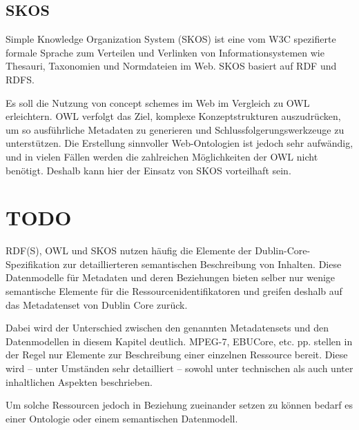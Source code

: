 	
	
	\subsection{SKOS}
	Simple Knowledge Organization System (SKOS) ist eine vom W3C spezifierte formale Sprache zum Verteilen und Verlinken von Informationsystemen wie Thesauri, Taxonomien und Normdateien im Web. SKOS basiert auf RDF und RDFS.
	
	Es soll die Nutzung von concept schemes im Web im Vergleich zu OWL erleichtern. OWL verfolgt das Ziel, komplexe Konzeptstrukturen auszudrücken, um so ausführliche Metadaten zu generieren und Schlussfolgerungswerkzeuge zu unterstützen. Die Erstellung sinnvoller Web-Ontologien ist jedoch sehr aufwändig, und in vielen Fällen werden die zahlreichen Möglichkeiten der OWL nicht benötigt. Deshalb kann hier der Einsatz von SKOS vorteilhaft sein.
	
	
	\section{TODO}
	RDF(S), OWL und SKOS nutzen häufig die Elemente der Dublin-Core-Spezifikation zur detaillierteren semantischen Beschreibung von Inhalten. Diese Datenmodelle für Metadaten und deren Beziehungen bieten selber nur wenige semantische Elemente für die Ressourcenidentifikatoren und greifen deshalb auf das Metadatenset von Dublin Core zurück.
	
	Dabei wird der Unterschied zwischen den genannten Metadatensets und den Datenmodellen in diesem Kapitel deutlich. MPEG-7, EBUCore, etc. pp. %
	stellen in der Regel nur Elemente zur Beschreibung einer einzelnen Ressource bereit. Diese wird -- unter Umständen sehr detailliert -- sowohl unter technischen als auch unter inhaltlichen Aspekten beschrieben.
	
	Um solche Ressourcen jedoch in Beziehung zueinander setzen zu können bedarf es einer Ontologie oder einem semantischen Datenmodell. 
	
